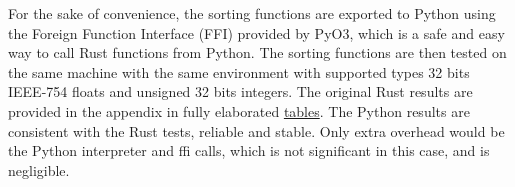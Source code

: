 \documentclass{article}
\begin{document}

For the sake of convenience, the sorting functions are exported to Python using the Foreign Function Interface (FFI) provided by PyO3, which is a safe and easy way to call Rust functions from Python.
The sorting functions are then tested on the same machine with the same environment with supported types 32 bits IEEE-754 floats and unsigned 32 bits integers. The original Rust results are provided in the appendix in fully elaborated \hyperlink{FullTables}{tables}. The Python results are consistent with the Rust tests, reliable and stable.
Only extra overhead would be the Python interpreter and ffi calls, which is not significant in this case, and is negligible.
\end{document}

